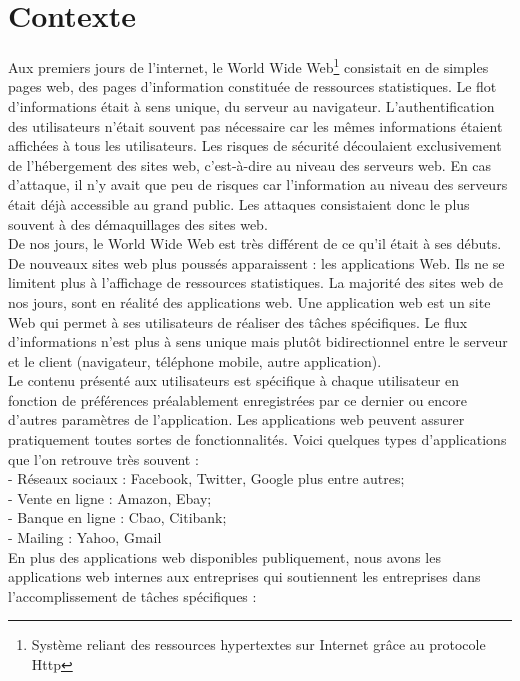 \section{Contexte}
Aux premiers jours de l’internet, le World Wide Web\footnote{Système reliant des ressources hypertextes sur Internet grâce au protocole Http} consistait en de simples pages web, des pages d’information constituée de ressources statistiques. Le flot d'informations était à sens unique, du serveur au navigateur. L’authentification des utilisateurs n’était souvent pas nécessaire car les mêmes informations étaient affichées à tous les utilisateurs. Les risques de sécurité découlaient exclusivement de l’hébergement des sites web, c’est-à-dire au niveau des serveurs web. En cas d’attaque, il n’y avait que peu de risques car l’information au niveau des serveurs était déjà accessible au grand public. Les attaques consistaient donc le plus souvent à des démaquillages des sites web.\\
De nos jours, le World Wide Web est très différent de ce qu’il était à ses débuts. De nouveaux sites web plus poussés apparaissent : les applications Web. Ils ne se limitent plus à l’affichage de ressources statistiques. La majorité des sites web de nos jours, sont en réalité des applications web. Une application web est un site Web qui permet à ses utilisateurs de réaliser des tâches spécifiques. Le flux d’informations n’est plus à sens unique mais plutôt bidirectionnel entre le serveur et le client (navigateur, téléphone mobile, autre application).\\
Le contenu présenté aux utilisateurs est spécifique à chaque utilisateur en fonction de préférences préalablement enregistrées par ce dernier ou encore d’autres paramètres de l’application. Les applications web peuvent assurer pratiquement toutes sortes de fonctionnalités. Voici quelques types d’applications que l’on retrouve très souvent :\\
- Réseaux sociaux : Facebook, Twitter, Google plus entre autres;\\
- Vente en ligne : Amazon, Ebay;\\
- Banque en ligne : Cbao, Citibank;\\
- Mailing : Yahoo, Gmail\\
En plus des applications web disponibles publiquement, nous avons les applications web internes aux entreprises qui soutiennent les entreprises dans l’accomplissement de tâches spécifiques : \\
